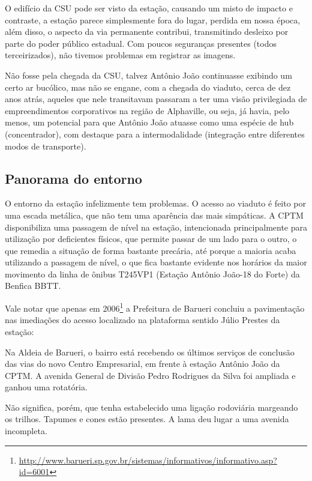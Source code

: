\documentclass[11pt,fleqn]{book} %
\begin{document}
O edifício da CSU pode ser visto da estação, causando um misto de impacto e contraste, a estação parece simplesmente fora do lugar, perdida em nossa época, além disso, o aspecto da via permanente contribui, transmitindo desleixo por parte do poder público estadual. Com poucos seguranças presentes (todos terceirizados), não tivemos problemas em registrar as imagens.

Não fosse pela chegada da CSU, talvez Antônio João continuasse exibindo um certo ar bucólico, mas não se engane, com a chegada do viaduto, cerca de dez anos atrás, aqueles que nele transitavam passaram a ter uma visão privilegiada de empreendimentos corporativos na região de Alphaville, ou seja, já havia, pelo menos, um potencial para que Antônio João atuasse como uma espécie de hub (concentrador), com destaque para a intermodalidade (integração entre diferentes modos de transporte).

\subsection{Panorama do entorno}

O entorno da estação infelizmente tem problemas. O acesso ao viaduto é feito por uma escada metálica, que não tem uma aparência das mais simpáticas. A CPTM disponibiliza uma passagem de nível na estação, intencionada principalmente para utilização por deficientes físicos, que permite passar de um lado para o outro, o que remedia a situação de forma bastante precária, até porque a maioria acaba utilizando a passagem de nível, o que fica bastante evidente nos horários da maior movimento da linha de ônibus T245VP1 (Estação Antônio João-18 do Forte) da Benfica BBTT.

Vale notar que apenas em 2006\footnote{\url{http://www.barueri.sp.gov.br/sistemas/informativos/informativo.asp?id=6001}} a Prefeitura de Barueri concluiu a pavimentação nas imediações do acesso localizado na plataforma sentido Júlio Prestes da estação:

\begin{citacao}
	Na Aldeia de Barueri, o bairro está recebendo os últimos serviços de conclusão das vias do novo Centro Empresarial, em frente à estação Antônio João da CPTM. A avenida General de Divisão Pedro Rodrigues da Silva foi ampliada e ganhou uma rotatória.
\end{citacao}

Não significa, porém, que tenha estabelecido uma ligação rodoviária margeando os trilhos. Tapumes e cones estão presentes. A lama deu lugar a uma avenida incompleta.
\end{document}

